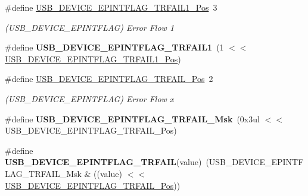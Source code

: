 \begin{DoxyCompactItemize}
\item 
\hypertarget{group___s_a_m_l21___u_s_b_ga14095c21551aee173b4cf51a4752289e}{}\#define \hyperlink{group___s_a_m_l21___u_s_b_ga14095c21551aee173b4cf51a4752289e}{U\+S\+B\+\_\+\+D\+E\+V\+I\+C\+E\+\_\+\+E\+P\+I\+N\+T\+F\+L\+A\+G\+\_\+\+T\+R\+F\+A\+I\+L1\+\_\+\+Pos}~3\label{group___s_a_m_l21___u_s_b_ga14095c21551aee173b4cf51a4752289e}

\begin{DoxyCompactList}\small\item\em (U\+S\+B\+\_\+\+D\+E\+V\+I\+C\+E\+\_\+\+E\+P\+I\+N\+T\+F\+L\+A\+G) Error Flow 1 \end{DoxyCompactList}\item 
\hypertarget{group___s_a_m_l21___u_s_b_ga15c2236625fcd3796b786434b14a434c}{}\#define {\bfseries U\+S\+B\+\_\+\+D\+E\+V\+I\+C\+E\+\_\+\+E\+P\+I\+N\+T\+F\+L\+A\+G\+\_\+\+T\+R\+F\+A\+I\+L1}~(1 $<$$<$ \hyperlink{group___s_a_m_l21___u_s_b_ga14095c21551aee173b4cf51a4752289e}{U\+S\+B\+\_\+\+D\+E\+V\+I\+C\+E\+\_\+\+E\+P\+I\+N\+T\+F\+L\+A\+G\+\_\+\+T\+R\+F\+A\+I\+L1\+\_\+\+Pos})\label{group___s_a_m_l21___u_s_b_ga15c2236625fcd3796b786434b14a434c}

\item 
\hypertarget{group___s_a_m_l21___u_s_b_ga0dcfe8589fa4aa6a596135a447291807}{}\#define \hyperlink{group___s_a_m_l21___u_s_b_ga0dcfe8589fa4aa6a596135a447291807}{U\+S\+B\+\_\+\+D\+E\+V\+I\+C\+E\+\_\+\+E\+P\+I\+N\+T\+F\+L\+A\+G\+\_\+\+T\+R\+F\+A\+I\+L\+\_\+\+Pos}~2\label{group___s_a_m_l21___u_s_b_ga0dcfe8589fa4aa6a596135a447291807}

\begin{DoxyCompactList}\small\item\em (U\+S\+B\+\_\+\+D\+E\+V\+I\+C\+E\+\_\+\+E\+P\+I\+N\+T\+F\+L\+A\+G) Error Flow x \end{DoxyCompactList}\item 
\hypertarget{group___s_a_m_l21___u_s_b_ga0700383f34df4f0782904973acc459a8}{}\#define {\bfseries U\+S\+B\+\_\+\+D\+E\+V\+I\+C\+E\+\_\+\+E\+P\+I\+N\+T\+F\+L\+A\+G\+\_\+\+T\+R\+F\+A\+I\+L\+\_\+\+Msk}~(0x3ul $<$$<$ U\+S\+B\+\_\+\+D\+E\+V\+I\+C\+E\+\_\+\+E\+P\+I\+N\+T\+F\+L\+A\+G\+\_\+\+T\+R\+F\+A\+I\+L\+\_\+\+Pos)\label{group___s_a_m_l21___u_s_b_ga0700383f34df4f0782904973acc459a8}

\item 
\hypertarget{group___s_a_m_l21___u_s_b_gaca6bf04a773fb69c181e970d61646abe}{}\#define {\bfseries U\+S\+B\+\_\+\+D\+E\+V\+I\+C\+E\+\_\+\+E\+P\+I\+N\+T\+F\+L\+A\+G\+\_\+\+T\+R\+F\+A\+I\+L}(value)~(U\+S\+B\+\_\+\+D\+E\+V\+I\+C\+E\+\_\+\+E\+P\+I\+N\+T\+F\+L\+A\+G\+\_\+\+T\+R\+F\+A\+I\+L\+\_\+\+Msk \& ((value) $<$$<$ \hyperlink{group___s_a_m_l21___u_s_b_ga0dcfe8589fa4aa6a596135a447291807}{U\+S\+B\+\_\+\+D\+E\+V\+I\+C\+E\+\_\+\+E\+P\+I\+N\+T\+F\+L\+A\+G\+\_\+\+T\+R\+F\+A\+I\+L\+\_\+\+Pos}))\label{group___s_a_m_l21___u_s_b_gaca6bf04a773fb69c181e970d61646abe}


\end{DoxyCompactItemize}
